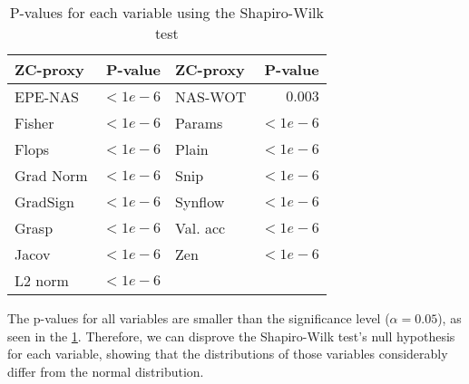 \begin{table}[h]
\caption{P-values for each variable using the Shapiro-Wilk test}
\centering
\begin{tabular}{lr||lr}
\textbf{ZC-proxy} & \textbf{P-value} & \textbf{ZC-proxy} & \textbf{P-value} \\ \hline
\multicolumn{1}{l|}{\cellcolor{verylightgray}EPE-NAS} & \cellcolor{verylightgray}$<1e-6$ & \multicolumn{1}{l|}{\cellcolor{verylightgray}NAS-WOT} & \cellcolor{verylightgray}$0.003$ \\
\multicolumn{1}{l|}{Fisher} & $< 1e-6$ & \multicolumn{1}{l|}{Params} & $< 1e-6$ \\
\multicolumn{1}{l|}{\cellcolor{verylightgray}Flops} & \cellcolor{verylightgray} $< 1e-6$ & \multicolumn{1}{l|}{\cellcolor{verylightgray}Plain} & \cellcolor{verylightgray} $< 1e-6$ \\
\multicolumn{1}{l|}{Grad Norm} & $< 1e-6$ & \multicolumn{1}{l|}{Snip} & $< 1e-6$ \\
\multicolumn{1}{l|}{\cellcolor{verylightgray}GradSign} & \cellcolor{verylightgray}$< 1e-6$ & \multicolumn{1}{l|}{\cellcolor{verylightgray}Synflow} & \cellcolor{verylightgray}$< 1e-6$ \\
\multicolumn{1}{l|}{Grasp} & $< 1e-6$ & \multicolumn{1}{l|}{Val. acc} & $< 1e-6$ \\
\multicolumn{1}{l|}{\cellcolor{verylightgray}Jacov} & \cellcolor{verylightgray}$< 1e-6$ & \multicolumn{1}{l|}{\cellcolor{verylightgray}Zen} & \cellcolor{verylightgray}$< 1e-6$ \\
\multicolumn{1}{l|}{L2 norm} & $< 1e-6$ & & \\
\end{tabular}
\label{tab:p_values}
\end{table}



The p-values for all variables are smaller than the significance level ($\alpha = 0.05$), as seen in the \cref{tab:p_values}. Therefore, we can disprove the Shapiro-Wilk test's null hypothesis for each variable, showing that the distributions of those variables considerably differ from the normal distribution.

